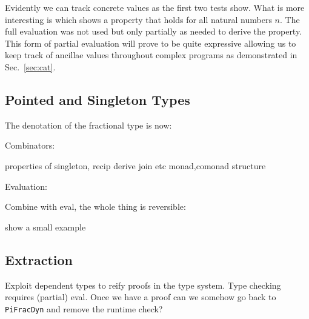 \documentclass[sigplan,10pt,review,anonymous]{acmart}
\begin{document}
\Jexampletest{}

Evidently we can track concrete values as the first two tests
show. What is more interesting is  which shows a
property that holds for all natural numbers $n$. The full evaluation
was not used but only partially as needed to derive the property. This
form of partial evaluation will prove to be quite expressive allowing
us to keep track of ancillae values throughout complex programs as
demonstrated in Sec.~\ref{sec:cat}. 

\subsection{Pointed and Singleton Types}
 
The denotation of the fractional type is now:

\PIPFUdef{}

Combinators:

\PIPFCombDef{}

properties of singleton, recip  
derive join etc  
monad,comonad structure  

Evaluation:
\PIPFeval{}

Combine with eval, the whole thing is reversible:
\PIPFrev{}

show a small example

\subsection{Extraction}

Exploit dependent types to reify proofs in the type system. Type
checking requires (partial) eval. Once we have a proof can we somehow
go back to \verb|PiFracDyn| and remove the runtime check?
\end{document}
